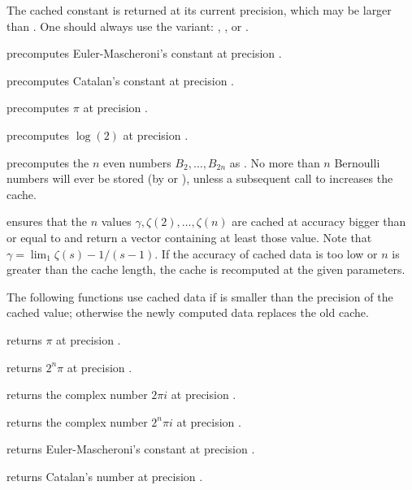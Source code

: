 


The cached constant is returned at its current precision, which may be larger
than . One should always use the  variant:
, , or .

 precomputes Euler-Mascheroni's constant
at precision .

 precomputes Catalan's constant at precision
.

 precomputes $\pi$ at precision .

 precomputes $\log(2)$ at precision
.

 precomputes the $n$ even  numbers
$B_2,\dots,B_{2n}$ as . No more than $n$ Bernoulli numbers will
ever be stored (by  or ), unless a subsequent
call to  increases the cache.

 ensures that the $n$ values
$\gamma, \zeta(2),\dots, \zeta(n)$ are cached at accuracy bigger than or equal
to  and return a vector containing at least those value. Note that
$\gamma = \lim_1 \zeta(s) - 1/(s-1)$. If the accuracy of cached data is too
low or $n$ is greater than the cache length, the cache is recomputed at the
given parameters.

The following functions use cached data if  is smaller than the
precision of the cached value; otherwise the newly computed data replaces the
old cache.

 returns $\pi$ at precision .

 returns $2^n\pi$ at precision .

 returns the complex number $2\pi i$ at
precision .

 returns the complex number $2^n\pi i$ at
precision .

 returns Euler-Mascheroni's constant at
precision .

 returns Catalan's number at precision .

